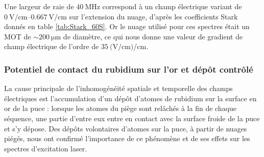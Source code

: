 %
%
Une largeur de raie de $\SI{40}{\MHz}$ correspond à un champ électrique variant de $\SIrange{0}{0.667}{\V/\cm}$ sur l'extension du nuage, d'après les coefficients Stark donnés en table \ref{tab:Stark_60S}.
Or le nuage utilisé pour ces spectres était un MOT de $\sim \SI{200}{\um}$ de diamètre, ce qui nous donne une valeur de gradient de champ électrique de l'ordre de $\SI{35}{(\V/\cm)\per\cm}$.


\subsubsection*{Potentiel de contact du rubidium sur l'or et dépôt contrôlé}
\noindent La cause principale de l'inhomogénéité spatiale et temporelle des champs électriques est l'accumulation d'un dépôt d'atomes de rubidium sur la surface en or de la puce :
lorsque les atomes du piège sont relâchés à la fin de chaque séquence, une partie d'entre eux entre en contact avec la surface froide de la puce et s'y dépose.
Des dépôts volontaires d'atomes sur la puce, à partir de nuages piégés, nous ont confirmé l'importance de ce phénomène et de ses effets sur les spectres d'excitation laser.


